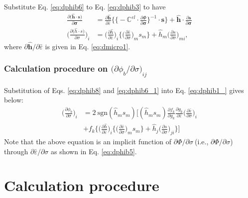 \documentclass[12pt]{amsart}
\begin{document}
Substitute Eq. \ref{eq:dphib6} to Eq. \ref{eq:dphib3} to have
\begin{equation}
  \label{eq:dphib6_1}
  \begin{split}
    \frac{\partial \big(\hat{\mathbf{h}}\cdot\mathbf{s}\big)  }{\partial\mathbf{\sigma}}&=\frac{\partial{\hat{\mathbf{h}}}}{\partial{\bar{\varepsilon}}} \bigg\{ \Big\{- \mathbb{C}^{el} \cdot \frac{\partial \Phi}{\partial{\mathbf{\sigma}}}\Big\}^{-1}\cdot\mathbf{s}\bigg\} + \hat{\mathbf{h}}\cdot\frac{\partial\mathbf{s}}{\partial\mathbf{\sigma}}\\
    \bigg(\frac{\partial \big(\hat{h}\cdot s\big)}{\partial \sigma}\bigg)_i & = \bigg(\frac{\partial\hat{h}}{\partial\bar{\varepsilon}}\bigg)_i \bigg\{\bigg(\frac{\partial\bar{\varepsilon}}{\partial\sigma}\bigg)_m s_m\bigg\} + \hat{h}_m\bigg(\frac{\partial s}{\partial \sigma}\bigg)_{mi},
  \end{split}
\end{equation}
where $\partial \hat{\mathbf{h}}/ \partial\bar{\varepsilon}$ is given in Eq. \ref{eq:dmicro1}.
\subsubsection{Calculation procedure on $\big(\partial\phi_b/\partial \sigma\big)_{ij}$}
\label{sec:calc}
Substitution of Eqs. \ref{eq:dphib8} and \ref{eq:dphib6_1} into Eq. \ref{eq:dphib1_} gives below:
\begin{equation}
  \label{eq:dphib_main}
  \begin{split}
    \bigg(\frac{\partial\phi_b}{\partial \sigma}\bigg)_i &= 2\ \text{sgn}(\hat{h}_ms_m) \bigg[(\hat{h}_ms_m)
    \frac{\partial f_k}{\partial g_k} \frac{\partial g_k}{\partial \bar{\varepsilon}}
    \bigg(\frac{\partial\bar{\varepsilon}}{\partial\sigma}\bigg)_i
   \\
    &+ f_k\bigg\{
    \bigg(\frac{\partial\hat{h}}{\partial\bar{\varepsilon}}\bigg)_i \bigg\{\bigg(\frac{\partial\bar{\varepsilon}}{\partial\sigma}\bigg)_m s_m\bigg\} + \hat{h}_j \bigg(\frac{\partial s}{\partial \sigma}\bigg)_{ji}
      \bigg\}
    \bigg]
  \end{split}
\end{equation}
Note that the above equation is an implicit function of $\partial\Phi/\partial\sigma\ $(i.e., $\partial\Phi/\partial \sigma$) through $\partial\bar{\varepsilon}/\partial\sigma$ as shown in Eq. \ref{eq:dphib5}.
\newpage
\section{Calculation procedure}
\label{sec:prc}
\end{document}
